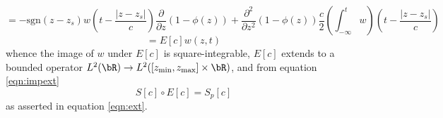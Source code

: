 \[
    = -\mbox{sgn}(z-z_s)w\left(t -\frac{|z-z_s|}{c}\right)\frac{\partial}{\partial z}(1-\phi(z)) +
  \frac{\partial^2}{\partial z^2}(1-\phi(z))\frac{c}{2}\left(\int_{-\infty}^tw\right)\left(t - \frac{|z-z_s|}{c}\right)
\]
\begin{equation}
  \label{eqn:defextop}
  =E[c]w(z,t)
\end{equation}
whence the image of $w$ under $E[c]$ is square-integrable,
$E[c]$ extends to a bounded operator $L^2(\bR) \rightarrow
L^2([z_{\rm min},z_{\rm max}]\times \bR)$, and from equation \ref{eqn:impext}
\begin{equation}
  \label{eqn:extapp}
S[c]\circ E[c] = S_p[c]
\end{equation}
as asserted in equation \ref{eqn:ext}.




